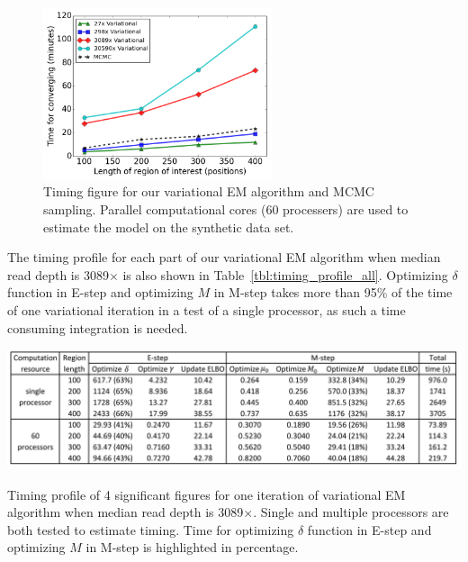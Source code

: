 \documentclass[11pt,reqno]{amsart}
\begin{document}
\begin{figure}[h]
\centering
\includegraphics[width=0.6\textwidth]{figs/timing_var_mcmc.png}
\caption{Timing figure for our variational EM algorithm and MCMC sampling.
Parallel computational cores (60 processers) are used to estimate the model on the synthetic data set.}
\label{tbl:timing_mcmc_var}
\end{figure}

The timing profile for each part of our variational EM algorithm when median read depth is 3089$\times$ is also shown in Table~\ref{tbl:timing_profile_all}.
Optimizing $\delta$ function in E-step and optimizing $M$ in M-step takes more than 95\% of the time of one variational iteration in a test of a single processor, as such a time consuming integration is needed.

\begin{table}[htbp]
\centering
\vspace{10pt}
\includegraphics[width=1.0\textwidth]{tables/time_3089X_all_update.png}
\caption{Timing profile of 4 significant figures for one iteration of variational EM algorithm when median read depth is 3089$\times$.
Single and multiple processors are both tested to estimate timing. Time for optimizing $\delta$ function in E-step and optimizing $M$ in M-step is highlighted in percentage.}
\label{tbl:timing_profile_all}
\end{table}
\end{document}
